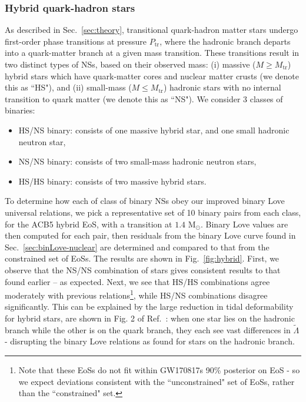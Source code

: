 \documentclass[prd,twocolumn,nofootinbib,superscriptaddress,amsmath,amssymb]{revtex4-1}
\begin{document}
\subsubsection{Hybrid quark-hadron stars}\label{sec:binLove-hybrid}
As described in Sec.~\ref{sec:theory}, transitional quark-hadron matter stars undergo first-order phase transitions at pressure $P_{\text{tr}}$, where the hadronic branch departs into a quark-matter branch at a given mass transition.
These transitions result in two distinct types of NSs, based on their observed mass: (i) massive ($M \geq M_{\text{tr}}$) hybrid stars which have quark-matter cores and nuclear matter crusts (we denote this as ``HS"), and (ii) small-mass ($M \leq M_{\text{tr}}$) hadronic stars with no internal transition to quark matter (we denote this as ``NS").
We consider 3 classes of binaries:
\begin{itemize}
\item HS/NS binary: consists of one massive hybrid star, and one small hadronic neutron star,
\item NS/NS binary: consists of two small-mass hadronic neutron stars,
\item HS/HS binary: consists of two massive hybrid stars.
\end{itemize}

To determine how each of class of binary NSs obey our improved binary Love universal relations, we pick a representative set of 10 binary pairs from each class, for the ACB5 hybrid EoS, with a transition at $1.4 \text{ M}_{\odot}$.
Binary Love values are then computed for each pair, then residuals from the binary Love curve found in Sec.~\ref{sec:binLove-nuclear} are determined and compared to that from the constrained set of EoSs.
The results are shown in Fig.~\ref{fig:hybrid}.
First, we observe that the NS/NS combination of stars gives consistent results to that found earlier -- as expected.
Next, we see that HS/HS combinations agree moderately with previous relations\footnote{Note that these EoSs do not fit within GW170817s 90\% posterior on EoS - so we expect deviations consistent with the ``unconstrained" set of EoSs, rather than the ``constrained" set.}, while HS/NS combinations disagree significantly.
This can be explained by the large reduction in tidal deformability for hybrid stars, are shown in Fig. 2 of Ref.~\cite{Paschalidis2018}: when one star lies on the hadronic branch while the other is on the quark branch, they each see vast differences in $\tilde{\Lambda}$ - disrupting the binary Love relations as found for stars on the hadronic branch.
\end{document}
